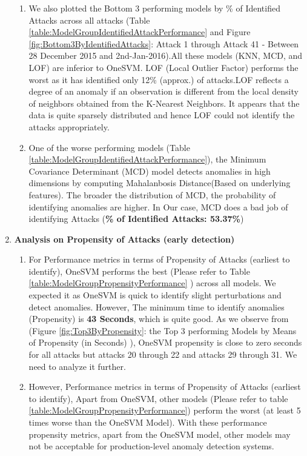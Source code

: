 \documentclass{article}
\begin{document}
\begin{enumerate}
\begin{enumerate}
            \item We also plotted the Bottom 3 performing models by \% of Identified Attacks across all attacks (Table \ref{table:ModelGroupIdentifiedAttackPerformance} and Figure \ref{fig:Bottom3ByIdentifiedAttacks}: Attack 1 through Attack 41 - Between 28 December 2015 and 2nd-Jan-2016).All these models (KNN, MCD, and LOF) are inferior to OneSVM.  LOF (Local Outlier Factor) performs the worst as it has identified only 12\% (approx.) of attacks.LOF reflects a degree of an anomaly if an observation is different from the local density of neighbors obtained from the K-Nearest Neighbors. It appears that the data is quite sparsely distributed and hence LOF could not identify the attacks appropriately. 
    
            \item One of the worse performing models (Table \ref{table:ModelGroupIdentifiedAttackPerformance}), the Minimum Covariance Determinant (MCD) model detects anomalies in high dimensions by computing Mahalanbosis Distance(Based on underlying features). The broader the distribution of MCD, the probability of identifying anomalies are higher. In Our case, MCD does a bad job of identifying Attacks (\textbf{\% of Identified Attacks: 53.37\%})
     
        \end{enumerate}
        
        
        \item \textbf{Analysis on Propensity of Attacks (early detection)}
        \begin{enumerate}
            \item For Performance metrics in terms of Propensity of Attacks (earliest to identify), OneSVM performs the best (Please refer to Table \ref{table:ModelGroupPropensityPerformance} ) across all models. We expected it as OneSVM is quick to identify slight perturbations and detect anomalies. However, The minimum time to identify anomalies (Propensity) is \textbf{43 Seconds}, which is quite good. As we observe from (Figure \ref{fig:Top3ByPropensity}: the Top 3 performing Models by Means of Propensity (in Seconds) ), OneSVM propensity is close to zero seconds for all attacks but attacks 20 through 22 and attacks 29 through 31. We need to analyze it further.

            \item However, Performance metrics in terms of Propensity of Attacks (earliest to identify), Apart from OneSVM, other models (Please refer to table \ref{table:ModelGroupPropensityPerformance}) perform the worst (at least 5 times worse than the OneSVM Model). With these performance propensity metrics, apart from the OneSVM model, other models may not be acceptable for production-level anomaly detection systems. 
            

\end{enumerate}
\end{enumerate}
\end{document}
